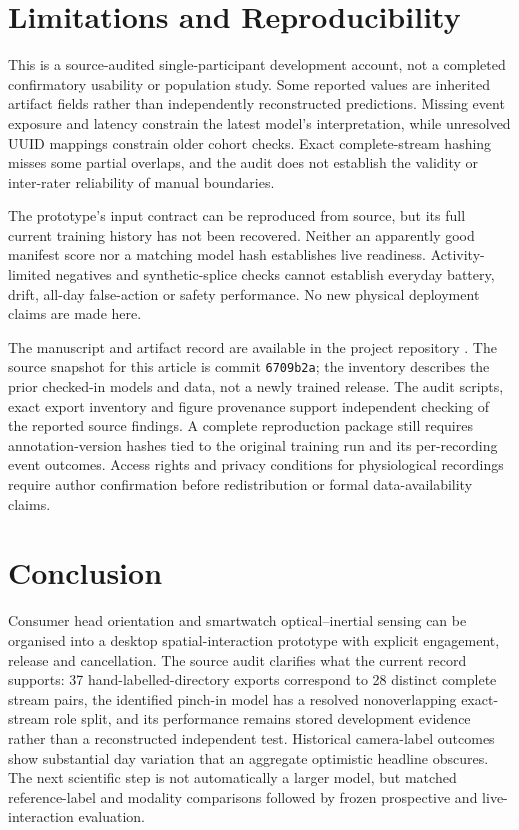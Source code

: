 \section{Limitations and Reproducibility}\label{limitations-and-reproducibility}

This is a source-audited single-participant development account, not a completed confirmatory usability or population study. Some reported values are inherited artifact fields rather than independently reconstructed predictions. Missing event exposure and latency constrain the latest model's interpretation, while unresolved UUID mappings constrain older cohort checks. Exact complete-stream hashing misses some partial overlaps, and the audit does not establish the validity or inter-rater reliability of manual boundaries.

The prototype's input contract can be reproduced from source, but its full current training history has not been recovered. Neither an apparently good manifest score nor a matching model hash establishes live readiness. Activity-limited negatives and synthetic-splice checks cannot establish everyday battery, drift, all-day false-action or safety performance. No new physical deployment claims are made here.

The manuscript and artifact record are available in the project repository \cite{repository}. The source snapshot for this article is commit \nolinkurl{6709b2a}; the inventory describes the prior checked-in models and data, not a newly trained release. The audit scripts, exact export inventory and figure provenance support independent checking of the reported source findings. A complete reproduction package still requires annotation-version hashes tied to the original training run and its per-recording event outcomes. Access rights and privacy conditions for physiological recordings require author confirmation before redistribution or formal data-availability claims.

\section{Conclusion}\label{conclusion}

Consumer head orientation and smartwatch optical--inertial sensing can be organised into a desktop spatial-interaction prototype with explicit engagement, release and cancellation. The source audit clarifies what the current record supports: 37 hand-labelled-directory exports correspond to 28 distinct complete stream pairs, the identified pinch-in model has a resolved nonoverlapping exact-stream role split, and its performance remains stored development evidence rather than a reconstructed independent test. Historical camera-label outcomes show substantial day variation that an aggregate optimistic headline obscures. The next scientific step is not automatically a larger model, but matched reference-label and modality comparisons followed by frozen prospective and live-interaction evaluation.

